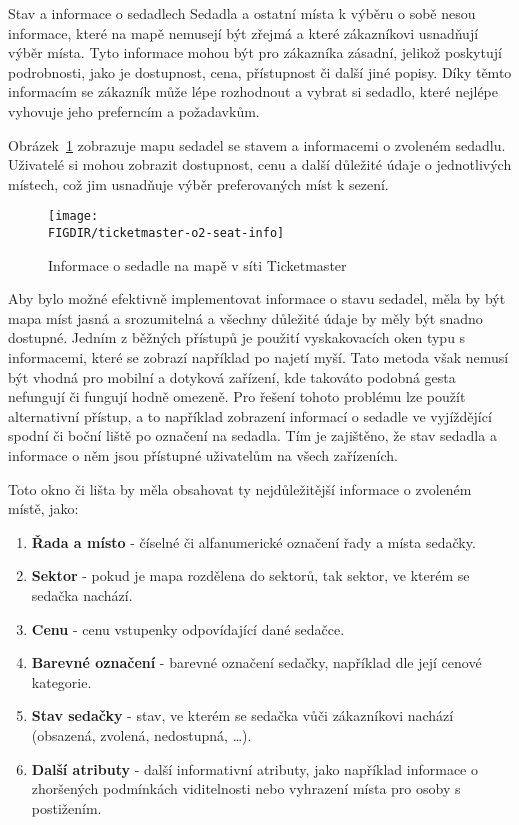 \begin{subsection}{Stav a informace o sedadlech}
    \label{subsec:identifikace-interaktivni-mapa-stav-a-informace-o-sedadlech}
    Sedadla a ostatní místa k výběru o sobě nesou informace, které na mapě nemusejí být zřejmá a které zákazníkovi usnadňují výběr místa.
    Tyto informace mohou být pro zákazníka zásadní, jelikož poskytují podrobnosti, jako je dostupnost, cena, přístupnost či další jiné popisy.
    Díky těmto informacím se zákazník může lépe rozhodnout a vybrat si sedadlo, které nejlépe vyhovuje jeho preferncím a požadavkům.

    Obrázek~\ref{fig:ticketmaster-o2-seat-info} zobrazuje mapu sedadel se stavem a informacemi o zvoleném sedadlu.
    Uživatelé si mohou zobrazit dostupnost, cenu a další důležité údaje o jednotlivých místech, což jim usnadňuje výběr preferovaných míst k sezení.

    \begin{figure}[H]
        \texttt{[image: \\FIGDIR/ticketmaster-o2-seat-info]}
        \centering
        \caption{Informace o sedadle na mapě v síti Ticketmaster\cite{t__www_ticketmaster_com}}
        \label{fig:ticketmaster-o2-seat-info}
    \end{figure}

    Aby bylo možné efektivně implementovat informace o stavu sedadel, měla by být mapa míst jasná a srozumitelná a všechny důležité údaje by měly být snadno dostupné.
    Jedním z běžných přístupů je použití vyskakovacích oken typu  s informacemi, které se zobrazí například po najetí myší.
    Tato metoda však nemusí být vhodná pro mobilní a dotyková zařízení, kde takováto podobná gesta nefungují či fungují hodně omezeně.
    Pro řešení tohoto problému lze použít alternativní přístup, a to například zobrazení informací o sedadle ve vyjíždějící spodní či boční liště po označení na sedadla.
    Tím je zajištěno, že stav sedadla a informace o něm jsou přístupné uživatelům na všech zařízeních.

    Toto okno či lišta by měla obsahovat ty nejdůležitější informace o zvoleném místě, jako:
    \begin{enumerate}
        \item \textbf{Řada a místo} - číselné či alfanumerické označení řady a místa sedačky.
        \item \textbf{Sektor} - pokud je mapa rozdělena do sektorů, tak sektor, ve kterém se sedačka nachází.
        \item \textbf{Cenu} - cenu vstupenky odpovídající dané sedačce.
        \item \textbf{Barevné označení} - barevné označení sedačky, například dle její cenové kategorie.
        \item \textbf{Stav sedačky} - stav, ve kterém se sedačka vůči zákazníkovi nachází (obsazená, zvolená, nedostupná, \ldots).
        \item \textbf{Další atributy} - další informativní atributy, jako například informace o zhoršených podmínkách viditelnosti nebo vyhrazení místa pro osoby s postižením.
    \end{enumerate}
\end{subsection}

